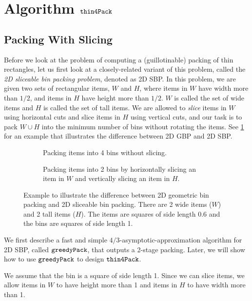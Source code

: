 \section{Algorithm \texorpdfstring{$\operatorname{\mathtt{thin4Pack}}$}{thin4Pack}}
\label{sec:thin-gpack}

\subsection{Packing With Slicing}

Before we look at the problem of computing a (guillotinable) packing of thin rectangles,
let us first look at a closely-related variant of this problem,
called the \emph{2D sliceable bin packing problem}, denoted as 2D SBP.
In this problem, we are given two sets of rectangular items, $W$ and $H$, where
items in $W$ have width more than $1/2$, and items in $H$ have height more than $1/2$.
$W$ is called the set of wide items and $H$ is called the set of tall items.
We are allowed to \emph{slice} items in $W$ using horizontal cuts
and slice items in $H$ using vertical cuts, and our task is to pack
$W \cup H$ into the minimum number of bins without rotating the items.
See \cref{fig:bp-vs-sbp} for an example that illustrates the difference
between 2D GBP and 2D SBP.

\begin{figure}[htb]
\begin{subfigure}{0.45\textwidth}
\centering

\caption{Packing items into 4 bins without slicing.}
\end{subfigure}
\hfil
\begin{subfigure}{0.45\textwidth}
\centering

\caption{Packing items into 2 bins by horizontally slicing an item in $W$
and vertically slicing an item in $H$.}
\end{subfigure}
\caption[2D GBP vs.~2D SBP]%
{Example to illustrate the difference between 2D geometric bin packing
and 2D sliceable bin packing. There are 2 wide items ($W$) and 2 tall items ($H$).
The items are squares of side length 0.6 and the bins are squares of side length 1.}
\label{fig:bp-vs-sbp}
\end{figure}

We first describe a fast and simple $4/3$-asymptotic-approximation algorithm
for 2D SBP, called $\operatorname{\mathtt{greedyPack}}$, that outputs a 2-stage packing.
Later, we will show how to use $\operatorname{\mathtt{greedyPack}}$ to design $\operatorname{\mathtt{thin4Pack}}$.

We assume that the bin is a square of side length 1. Since we can slice items,
we allow items in $W$ to have height more than 1
and items in $H$ to have width more than 1.

